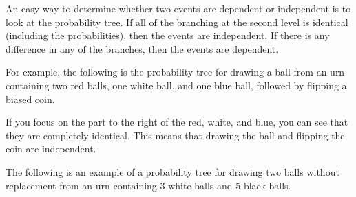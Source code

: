 \documentclass{ximera}
\begin{document}
An easy way to determine whether two events are dependent or independent is to look at the probability tree. If all of the branching at the second level is identical (including the probabilities), then the events are independent. If there is any difference in any of the branches, then the events are dependent.

For example, the following is the probability tree for drawing a ball from an urn containing two red balls, one white ball, and one blue ball, followed by flipping a biased coin.

\begin{image}
\end{image}

If you focus on the part to the right of the red, white, and blue, you can see that they are completely identical. This means that drawing the ball and flipping the coin are independent.

The following is an example of a probability tree for drawing two balls without replacement from an urn containing 3 white balls and 5 black balls.
\end{document}

